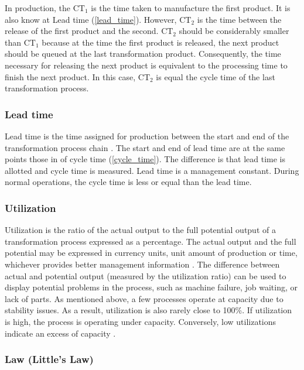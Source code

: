 \documentclass{article}
\begin{document}
In production, the \(\mbox{CT}_1\) is the time taken to manufacture the first product.
It is also know at Lead time (\ref{lead_time}).
However, \(\mbox{CT}_2\) is the time between the release of the first product and the second.
 \(\mbox{CT}_2\) should be considerably smaller than \(\mbox{CT}_1\) because at the time the first product is released, the next product should be queued at the last transformation product.
Consequently, the time necessary for releasing the next product is equivalent to the processing time to finish the next product.
In this case, \(\mbox{CT}_2\) is equal the cycle time of the last transformation process.

\subsubsection{Lead time \label{lead_time}}
\label{sec:org7608a8d}

Lead time is the time assigned for production between the start and end of the transformation process chain \citep{Hopp2001}.
The start and end of lead time are at the same points those in of cycle time (\ref{cycle_time}).
The difference is that lead time is allotted and cycle time is measured.
Lead time is a management constant.
During normal operations, the cycle time is less or equal than the lead time.

\subsubsection{Utilization \label{utilization}}
\label{sec:orgc5d3ec2}

Utilization is the ratio of the actual output to the full potential output of a transformation process expressed as a percentage.
The actual output and the full potential may be expressed in currency units, unit amount of production or time, whichever provides better management information \citep{Kumar2009}.
The difference between actual and potential output (measured by the utilization ratio) can be used to display potential problems in the process, such as machine failure, job waiting, or lack of parts.
As mentioned above, a few processes operate at capacity due to stability issues.
As a result, utilization is also rarely close to 100\%.
If utilization is high, the process is operating under capacity.
Conversely, low utilizations indicate an excess of capacity \citep{Hopp2001}.

\subsubsection{Law (Little's Law) \label{littles_law}}
\label{sec:org3b63288}
\end{document}
